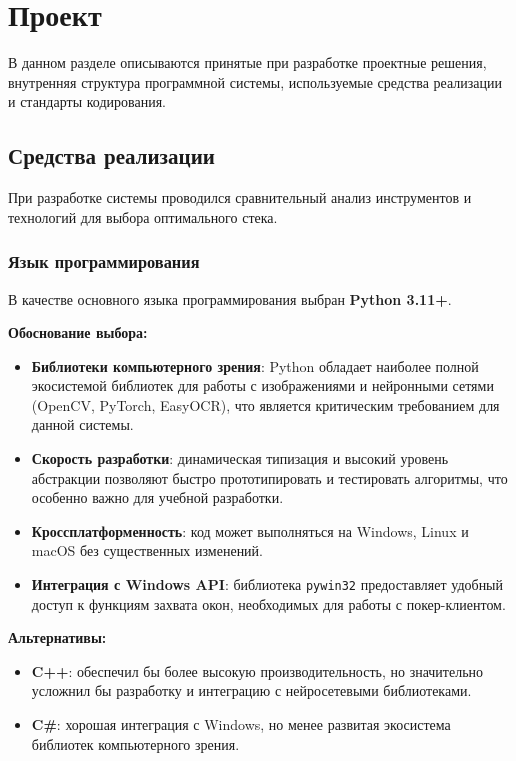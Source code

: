 \section{Проект}
\label{sec:project}

В данном разделе описываются принятые при разработке проектные решения, внутренняя структура программной системы, используемые средства реализации и стандарты кодирования.

\subsection{Средства реализации}

При разработке системы проводился сравнительный анализ инструментов и технологий для выбора оптимального стека.

\subsubsection*{Язык программирования}

В качестве основного языка программирования выбран \textbf{Python 3.11+}.

\textbf{Обоснование выбора:}
\begin{itemize}
    \item \textbf{Библиотеки компьютерного зрения}: Python обладает наиболее полной экосистемой библиотек для работы с изображениями и нейронными сетями (OpenCV, PyTorch, EasyOCR), что является критическим требованием для данной системы.
    \item \textbf{Скорость разработки}: динамическая типизация и высокий уровень абстракции позволяют быстро прототипировать и тестировать алгоритмы, что особенно важно для учебной разработки.
    \item \textbf{Кроссплатформенность}: код может выполняться на Windows, Linux и macOS без существенных изменений.
    \item \textbf{Интеграция с Windows API}: библиотека \texttt{pywin32} предоставляет удобный доступ к функциям захвата окон, необходимых для работы с покер-клиентом.
\end{itemize}

\textbf{Альтернативы:}
\begin{itemize}
    \item \textbf{C++}: обеспечил бы более высокую производительность, но значительно усложнил бы разработку и интеграцию с нейросетевыми библиотеками.
    \item \textbf{C\#}: хорошая интеграция с Windows, но менее развитая экосистема библиотек компьютерного зрения.
\end{itemize}


